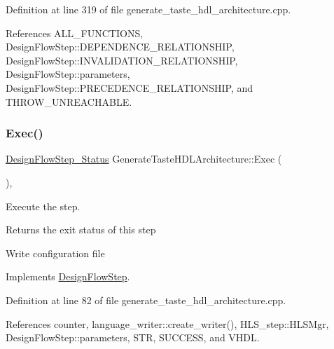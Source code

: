 Definition at line 319 of file generate\+\_\+taste\+\_\+hdl\+\_\+architecture.\+cpp.



References A\+L\+L\+\_\+\+F\+U\+N\+C\+T\+I\+O\+NS, Design\+Flow\+Step\+::\+D\+E\+P\+E\+N\+D\+E\+N\+C\+E\+\_\+\+R\+E\+L\+A\+T\+I\+O\+N\+S\+H\+IP, Design\+Flow\+Step\+::\+I\+N\+V\+A\+L\+I\+D\+A\+T\+I\+O\+N\+\_\+\+R\+E\+L\+A\+T\+I\+O\+N\+S\+H\+IP, Design\+Flow\+Step\+::parameters, Design\+Flow\+Step\+::\+P\+R\+E\+C\+E\+D\+E\+N\+C\+E\+\_\+\+R\+E\+L\+A\+T\+I\+O\+N\+S\+H\+IP, and T\+H\+R\+O\+W\+\_\+\+U\+N\+R\+E\+A\+C\+H\+A\+B\+LE.

\mbox{\label{classGenerateTasteHDLArchitecture_a6d92a9a5da5f96e8de1f4a2fab12c572}} 
\subsubsection{\texorpdfstring{Exec()}{Exec()}}
{\footnotesize\ttfamily \hyperlink{design__flow__step_8hpp_afb1f0d73069c26076b8d31dbc8ebecdf}{Design\+Flow\+Step\+\_\+\+Status} Generate\+Taste\+H\+D\+L\+Architecture\+::\+Exec (\begin{DoxyParamCaption}{ }\end{DoxyParamCaption})\hspace{0.3cm}{\ttfamily [override]}, {\ttfamily [virtual]}}



Execute the step. 

\begin{DoxyReturn}{Returns}
the exit status of this step 
\end{DoxyReturn}
Write configuration file 

Implements \hyperlink{classDesignFlowStep_a77d7e38493016766098711ea24f60b89}{Design\+Flow\+Step}.



Definition at line 82 of file generate\+\_\+taste\+\_\+hdl\+\_\+architecture.\+cpp.



References counter, language\+\_\+writer\+::create\+\_\+writer(), H\+L\+S\+\_\+step\+::\+H\+L\+S\+Mgr, Design\+Flow\+Step\+::parameters, S\+TR, S\+U\+C\+C\+E\+SS, and V\+H\+DL.

